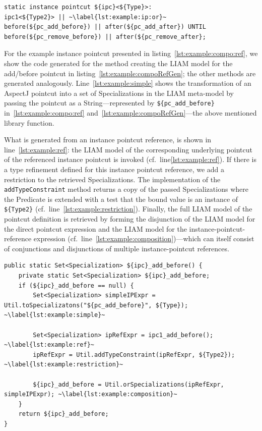 \documentclass{acm_proc_article-sp}
\begin{document}
\begin{lstlisting}[float,caption={Example of an instance pointcut using composition and type refinement}, label=lst:example:compo:ref,moreemph=instance]
static instance pointcut ${ipc}<${Type}>:
ipc1<${Type2}> || ~\label{lst:example:ip:or}~
before(${pc_add_before}) || after(${pc_add_after}) UNTIL 
before(${pc_remove_before}) || after(${pc_remove_after};
\end{lstlisting}

For the example instance pointcut presented in listing~\ref{lst:example:compo:ref}, we show the code generated for the method creating the LIAM model for the add/before pointcut in listing~\ref{lst:example:compoRefGen}; the other methods are generated analogously.
Line~\ref{lst:example:simple} shows the transformation of an AspectJ pointcut into a set of Specializations in the LIAM meta-model by passing the pointcut as a String---represented by \lstinline!${pc_add_before}! in~\ref{lst:example:compo:ref} and~\ref{lst:example:compoRefGen}---the above mentioned library function.

What is generated from an instance pointcut reference, is shown in line~\ref{lst:example:ref}: the LIAM model of the corresponding underlying pointcut of the referenced instance pointcut is invoked (cf.~line\ref{lst:example:ref}).
If there is a type refinement defined for this instance pointcut reference, we add a restriction to the retrieved Specializations.
The implementation of the \lstinline!addTypeConstraint! method returns a copy of the passed Specializations where the Predicate is extended with a test that the bound value is an instance of \lstinline!${Type2}! (cf.\ line~\ref{lst:example:restriction}).
Finally, the full LIAM model of the pointcut definition is retrieved by forming the disjunction of the LIAM model for the direct pointcut expression and the LIAM model for the instance-pointcut-reference expression (cf.\ line~\ref{lst:example:composition})---which can itself consist of conjunctions and disjunctions of multiple instance-pointcut references.

\begin{lstlisting}[float,caption={Generated code for creating the LIAM model for the add/before pointcut of the example instance pointcut.},label={lst:example:compoRefGen}]
public static Set<Specialization> ${ipc}_add_before() {
	private static Set<Specialization> ${ipc}_add_before;
	if (${ipc}_add_before == null) {
		Set<Specialization> simpleIPExpr = Util.toSpecializatons("${pc_add_before}", ${Type}); ~\label{lst:example:simple}~
		
		Set<Specialization> ipRefExpr = ipc1_add_before(); ~\label{lst:example:ref}~
		ipRefExpr = Util.addTypeConstraint(ipRefExpr, ${Type2}); ~\label{lst:example:restriction}~
		
		${ipc}_add_before = Util.orSpecializations(ipRefExpr, simpleIPExpr); ~\label{lst:example:composition}~
	}
	return ${ipc}_add_before;
}
\end{lstlisting}
\end{document}
